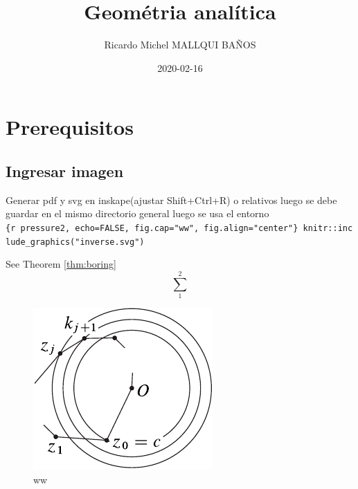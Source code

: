 \documentclass[12pt,]{book}
\title{Geométria analítica}
\author{Ricardo Michel MALLQUI BAÑOS}
\date{2020-02-16}
\theoremstyle{definition}
\theoremstyle{definition}
\theoremstyle{definition}
\theoremstyle{remark}
\begin{document}
\maketitle

{
\setcounter{tocdepth}{1}
\tableofcontents
}
\newcommand{\N}{\mathbb{N}}
\newcommand{\R}{\mathbb{R}}
\newcommand{\CC}{\mathbb{C}}
\newcommand{\I}{\mathbb{I}}
\newcommand{\f}{\mathbb{f}}
\newcommand{\X}{\mathbb{X}}
\newcommand{\D}{\mathbb{D}}
\newcommand{\Z}{\mathbb{Z}}
\newcommand{\Q}{\mathbb{Q}}
\newcommand{\norm}[1]{\left\Vert#1\right\Vert}
\newcommand{\abs}[1]{\left\vert#1\right\vert}
\newcommand{\set}[1]{\left\{#1\right\}}
\newcommand{\seq}[1]{\left<#1\right>}
\newcommand{\co}[1]{\left[#1\right]}
\newcommand{\cc}[1]{\left(#1\right)}
\newcommand{\J}{\mathcal{J}}
\newcommand{\K}{\mathcal{K}}
\newcommand{\M}{\mathcal{M}}
\newcommand{\F}{\mathcal{F}}

\hypertarget{prerequisitos}{%
\chapter{Prerequisitos}\label{prerequisitos}}

\hypertarget{ingresar-imagen}{%
\section{Ingresar imagen}\label{ingresar-imagen}}

Generar pdf y svg en inskape(ajustar Shift+Ctrl+R) o relativos luego se debe guardar en el mismo directorio general luego se usa el entorno
\texttt{\{r\ pressure2,\ echo=FALSE,\ fig.cap="ww",\ fig.align="center"\}\ knitr::include\_graphics("inverse.svg")}

See Theorem \ref{thm:boring} \[\sum_1^2\]

\begin{figure}

{\centering \includegraphics{inverse} 

}

\caption{ww}\label{fig:pressure2}
\end{figure}
\end{document}
